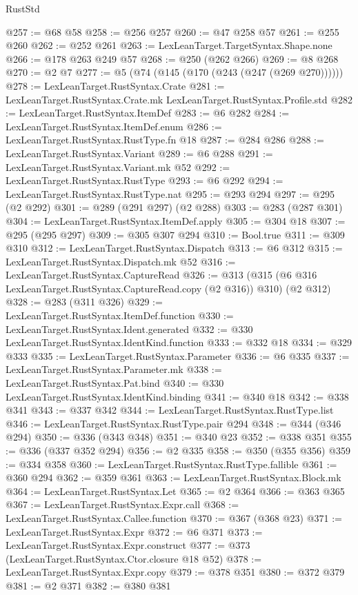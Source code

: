 \begin{lexlean}{RustStd}
\begin{coremodule}
@257 := @68 @58
@258 := @256 @257
@260 := @47 @258 @57
@261 := @255 @260
@262 := @252 @261
@263 := LexLeanTarget.TargetSyntax.Shape.none
@266 := @178 @263 @249 @57
@268 := @250 (@262 @266)
@269 := @8 @268
@270 := @2 @7
@277 := @5 (@74 (@145 (@170 (@243 (@247 (@269 @270))))))
@278 := LexLeanTarget.RustSyntax.Crate
@281 := LexLeanTarget.RustSyntax.Crate.mk LexLeanTarget.RustSyntax.Profile.std
@282 := LexLeanTarget.RustSyntax.ItemDef
@283 := @6 @282
@284 := LexLeanTarget.RustSyntax.ItemDef.enum
@286 := LexLeanTarget.RustSyntax.RustType.fn @18
@287 := @284 @286
@288 := LexLeanTarget.RustSyntax.Variant
@289 := @6 @288
@291 := LexLeanTarget.RustSyntax.Variant.mk @52
@292 := LexLeanTarget.RustSyntax.RustType
@293 := @6 @292
@294 := LexLeanTarget.RustSyntax.RustType.nat
@295 := @293 @294
@297 := @295 (@2 @292)
@301 := @289 (@291 @297) (@2 @288)
@303 := @283 (@287 @301)
@304 := LexLeanTarget.RustSyntax.ItemDef.apply
@305 := @304 @18
@307 := @295 (@295 @297)
@309 := @305 @307 @294
@310 := Bool.true
@311 := @309 @310
@312 := LexLeanTarget.RustSyntax.Dispatch
@313 := @6 @312
@315 := LexLeanTarget.RustSyntax.Dispatch.mk @52
@316 := LexLeanTarget.RustSyntax.CaptureRead
@326 := @313 (@315 (@6 @316 LexLeanTarget.RustSyntax.CaptureRead.copy (@2 @316)) @310) (@2 @312)
@328 := @283 (@311 @326)
@329 := LexLeanTarget.RustSyntax.ItemDef.function
@330 := LexLeanTarget.RustSyntax.Ident.generated
@332 := @330 LexLeanTarget.RustSyntax.IdentKind.function
@333 := @332 @18
@334 := @329 @333
@335 := LexLeanTarget.RustSyntax.Parameter
@336 := @6 @335
@337 := LexLeanTarget.RustSyntax.Parameter.mk
@338 := LexLeanTarget.RustSyntax.Pat.bind
@340 := @330 LexLeanTarget.RustSyntax.IdentKind.binding
@341 := @340 @18
@342 := @338 @341
@343 := @337 @342
@344 := LexLeanTarget.RustSyntax.RustType.list
@346 := LexLeanTarget.RustSyntax.RustType.pair @294
@348 := @344 (@346 @294)
@350 := @336 (@343 @348)
@351 := @340 @23
@352 := @338 @351
@355 := @336 (@337 @352 @294)
@356 := @2 @335
@358 := @350 (@355 @356)
@359 := @334 @358
@360 := LexLeanTarget.RustSyntax.RustType.fallible
@361 := @360 @294
@362 := @359 @361
@363 := LexLeanTarget.RustSyntax.Block.mk
@364 := LexLeanTarget.RustSyntax.Let
@365 := @2 @364
@366 := @363 @365
@367 := LexLeanTarget.RustSyntax.Expr.call
@368 := LexLeanTarget.RustSyntax.Callee.function
@370 := @367 (@368 @23)
@371 := LexLeanTarget.RustSyntax.Expr
@372 := @6 @371
@373 := LexLeanTarget.RustSyntax.Expr.construct
@377 := @373 (LexLeanTarget.RustSyntax.Ctor.closure @18 @52)
@378 := LexLeanTarget.RustSyntax.Expr.copy
@379 := @378 @351
@380 := @372 @379
@381 := @2 @371
@382 := @380 @381

\end{coremodule}
\end{lexlean}
